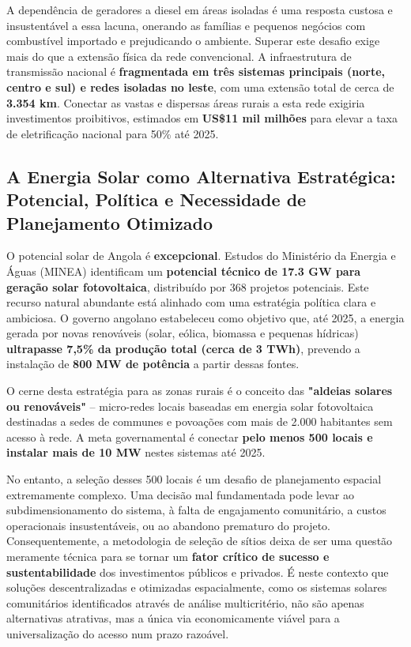 \documentclass[12pt, a4paper]{article}
\begin{document}
A dependência de geradores a diesel em áreas isoladas é uma resposta custosa e insustentável a essa lacuna, onerando as famílias e pequenos negócios com combustível importado e prejudicando o ambiente. Superar este desafio exige mais do que a extensão física da rede convencional. A infraestrutura de transmissão nacional é \textbf{fragmentada em três sistemas principais (norte, centro e sul) e redes isoladas no leste}, com uma extensão total de cerca de \textbf{3.354 km}. Conectar as vastas e dispersas áreas rurais a esta rede exigiria investimentos proibitivos, estimados em \textbf{US\$11 mil milhões} para elevar a taxa de eletrificação nacional para 50\% até 2025.

\subsection{A Energia Solar como Alternativa Estratégica: Potencial, Política e Necessidade de Planejamento Otimizado}

O potencial solar de Angola é \textbf{excepcional}. Estudos do Ministério da Energia e Águas (MINEA) identificam um \textbf{potencial técnico de 17.3 GW para geração solar fotovoltaica}, distribuído por 368 projetos potenciais. Este recurso natural abundante está alinhado com uma estratégia política clara e ambiciosa. O governo angolano estabeleceu como objetivo que, até 2025, a energia gerada por novas renováveis (solar, eólica, biomassa e pequenas hídricas) \textbf{ultrapasse 7,5\% da produção total (cerca de 3 TWh)}, prevendo a instalação de \textbf{800 MW de potência} a partir dessas fontes.

O cerne desta estratégia para as zonas rurais é o conceito das \textbf{"aldeias solares ou renováveis"} – micro-redes locais baseadas em energia solar fotovoltaica destinadas a sedes de communes e povoações com mais de 2.000 habitantes sem acesso à rede. A meta governamental é conectar \textbf{pelo menos 500 locais e instalar mais de 10 MW} nestes sistemas até 2025. 

No entanto, a seleção desses 500 locais é um desafio de planejamento espacial extremamente complexo. Uma decisão mal fundamentada pode levar ao subdimensionamento do sistema, à falta de engajamento comunitário, a custos operacionais insustentáveis, ou ao abandono prematuro do projeto. Consequentemente, a metodologia de seleção de sítios deixa de ser uma questão meramente técnica para se tornar um \textbf{fator crítico de sucesso e sustentabilidade} dos investimentos públicos e privados. É neste contexto que soluções descentralizadas e otimizadas espacialmente, como os sistemas solares comunitários identificados através de análise multicritério, não são apenas alternativas atrativas, mas a única via economicamente viável para a universalização do acesso num prazo razoável.
\end{document}
